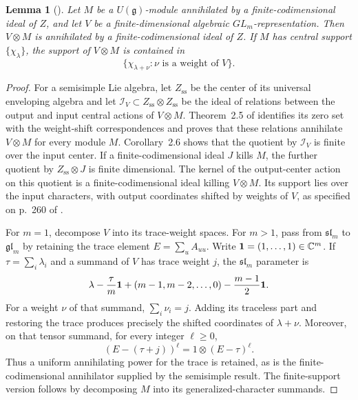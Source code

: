 \documentclass[11pt,a4paper]{article}
\numberwithin{equation}{section}
\newtheorem{lemma}[theorem]{Lemma}
\theoremstyle{definition}
\newcommand{\C}{\mathbb C}
\newcommand{\g}{\mathfrak g}
\begin{document}
\begin{lemma}[{\cite[Theorem~2.5, Corollary~2.6, and p.~260]{BG}}]\label{lem:tensorsupport}
Let $M$ be a $U(\g)$-module annihilated by a finite-codimensional
ideal of $Z$, and let $V$ be a finite-dimensional algebraic
$GL_m$-representation. Then $V\otimes M$ is annihilated by a
finite-codimensional ideal of $Z$. If $M$ has central support
$\{\chi_\lambda\}$, the support of $V\otimes M$ is contained in
\[
\{\chi_{\lambda+\nu}:\nu\text{ is a weight of }V\}.
\]
\end{lemma}
\begin{proof}
For a semisimple Lie algebra, let $Z_{\mathrm{ss}}$ be the center
of its universal enveloping algebra
and let $\mathcal I_V\subset Z_{\mathrm{ss}}\otimes Z_{\mathrm{ss}}$
be the ideal of relations between the output and input central
actions of $V\otimes M$. Theorem~2.5 of \cite{BG} identifies its
zero set with the weight-shift correspondences and proves that
these relations annihilate $V\otimes M$ for every module $M$.
Corollary~2.6 shows that the quotient by $\mathcal I_V$ is finite
over the input center. If a finite-codimensional ideal $J$ kills
$M$, the further quotient by $Z_{\mathrm{ss}}\otimes J$ is finite
dimensional. The kernel of the output-center action on this
quotient is a finite-codimensional ideal killing $V\otimes M$.
Its support lies over the input characters, with output coordinates
shifted by weights of $V$, as specified on p.~260 of \cite{BG}.

For $m=1$, decompose $V$ into its trace-weight spaces. For $m>1$,
pass from $\mathfrak{sl}_m$ to $\mathfrak{gl}_m$ by retaining the
trace element $E=\sum_u A_{uu}$. Write ${\bf1}=(1,\ldots,1)\in\C^m$.
If $\tau=\sum_i\lambda_i$ and a summand of
$V$ has trace weight $j$, the $\mathfrak{sl}_m$ parameter is
\[
\lambda-\frac{\tau}{m}{\bf1}
+(m-1,m-2,\ldots,0)-\frac{m-1}{2}{\bf1}.
\]
For a weight $\nu$ of that summand, $\sum_i\nu_i=j$.
Adding its traceless part and restoring the trace produces precisely
the shifted coordinates of $\lambda+\nu$. Moreover, on that tensor
summand, for every integer $\ell\ge0$,
\[
(E-(\tau+j))^\ell=1\otimes(E-\tau)^\ell.
\]
Thus a uniform annihilating power for the trace is retained, as is
the finite-codimensional annihilator supplied by the semisimple
result. The finite-support version follows by decomposing $M$ into
its generalized-character summands.
\end{proof}
\end{document}
